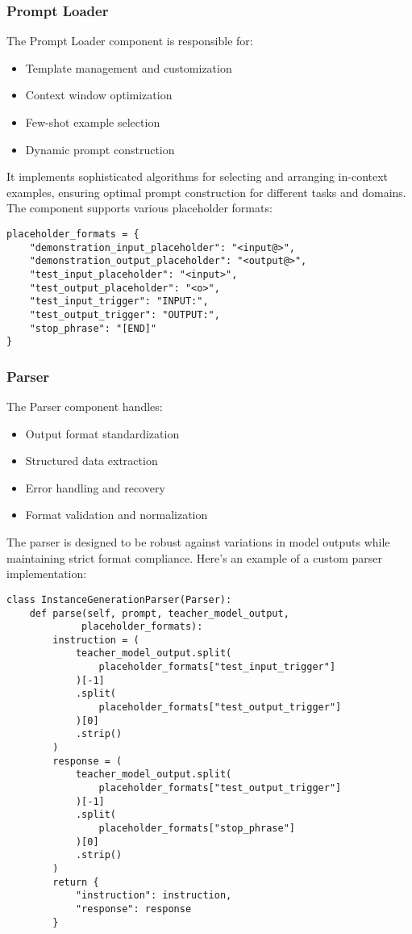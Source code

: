 \documentclass[10pt,conference]{IEEEtran}
\begin{document}
\subsubsection{Prompt Loader}
The Prompt Loader component is responsible for:
\begin{itemize}
    \item Template management and customization
    \item Context window optimization
    \item Few-shot example selection
    \item Dynamic prompt construction
\end{itemize}

It implements sophisticated algorithms for selecting and arranging in-context examples, ensuring optimal prompt construction for different tasks and domains. The component supports various placeholder formats:

\begin{lstlisting}
placeholder_formats = {
    "demonstration_input_placeholder": "<input@>",
    "demonstration_output_placeholder": "<output@>",
    "test_input_placeholder": "<input>",
    "test_output_placeholder": "<o>",
    "test_input_trigger": "INPUT:",
    "test_output_trigger": "OUTPUT:",
    "stop_phrase": "[END]"
}
\end{lstlisting}

\subsubsection{Parser}
The Parser component handles:
\begin{itemize}
    \item Output format standardization
    \item Structured data extraction
    \item Error handling and recovery
    \item Format validation and normalization
\end{itemize}

The parser is designed to be robust against variations in model outputs while maintaining strict format compliance. Here's an example of a custom parser implementation:

\begin{lstlisting}
class InstanceGenerationParser(Parser):
    def parse(self, prompt, teacher_model_output, 
             placeholder_formats):
        instruction = (
            teacher_model_output.split(
                placeholder_formats["test_input_trigger"]
            )[-1]
            .split(
                placeholder_formats["test_output_trigger"]
            )[0]
            .strip()
        )
        response = (
            teacher_model_output.split(
                placeholder_formats["test_output_trigger"]
            )[-1]
            .split(
                placeholder_formats["stop_phrase"]
            )[0]
            .strip()
        )
        return {
            "instruction": instruction, 
            "response": response
        }
\end{lstlisting}
\end{document}
